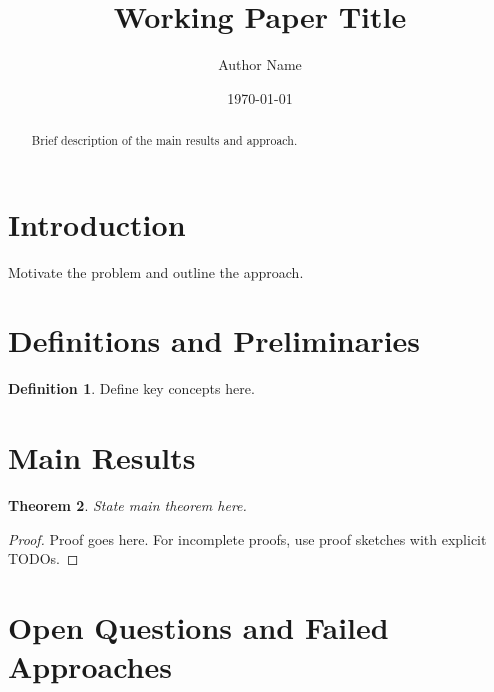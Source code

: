 \documentclass{article}
\title{Working Paper Title}
\author{Author Name}
\date{\today}
\newtheorem{theorem}{Theorem}
\theoremstyle{definition}
\newtheorem{definition}[theorem]{Definition}
\theoremstyle{remark}
\begin{document}
\maketitle

\begin{abstract}
Brief description of the main results and approach.
\end{abstract}

\section{Introduction}

Motivate the problem and outline the approach.


\section{Definitions and Preliminaries}

\begin{definition}
Define key concepts here.
\end{definition}


\section{Main Results}

\begin{theorem}
\label{thm:main}
State main theorem here.
\end{theorem}

\begin{proof}
Proof goes here. For incomplete proofs, use proof sketches with explicit TODOs.
\end{proof}


\section{Open Questions and Failed Approaches}
\end{document}
